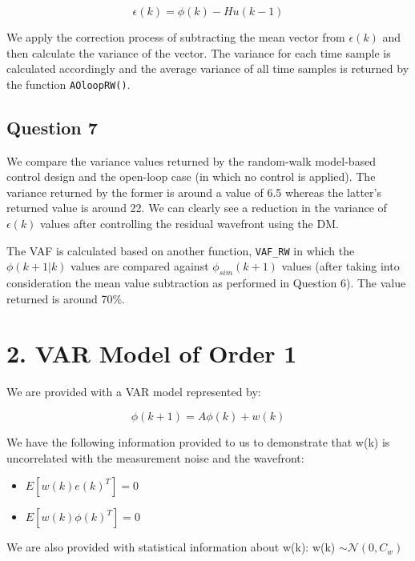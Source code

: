 \documentclass[12pt]{report}
\begin{document}
\begin{equation*}
\epsilon(k) = \phi(k) - Hu(k-1) 
\end{equation*}

We apply the correction process of subtracting the mean vector from $\epsilon(k)$ and then calculate the variance of the vector. The variance for each time sample is calculated accordingly and the average variance of all time samples is returned by the function \texttt{AOloopRW()}.

\subsection*{Question 7}

We compare the variance values returned by the random-walk model-based control design and the open-loop case (in which no control is applied). The variance returned by the former is around a value of 6.5 whereas the latter's returned value is around 22. We can clearly see a reduction in the variance of $\epsilon(k)$ values after controlling the residual wavefront using the DM.

The VAF is calculated based on another function, \texttt{VAF\_RW} in which the $\phi(k+1|k)$ values are compared against $\phi_{sim}(k+1)$ values (after taking into consideration the mean value subtraction as performed in Question 6). The value returned is around 70\%.

\newpage
\section*{2. VAR Model of Order 1}

We are provided with a VAR model represented by:

\begin{equation}\label{eq:var_eqn}
	\phi(k+1) = A\phi(k) + w(k)
\end{equation}

We have the following information provided to us to demonstrate that w(k) is uncorrelated with the measurement noise and the wavefront:
\begin{itemize}
\item $E\left[w(k)e(k)^{T}\right] = 0$
\item $E\left[w(k)\phi(k)^{T}\right] = 0$
\end{itemize}

We are also provided with statistical information about w(k): w(k) $\sim \mathcal{N}(0, C_{w})$
\end{document}
